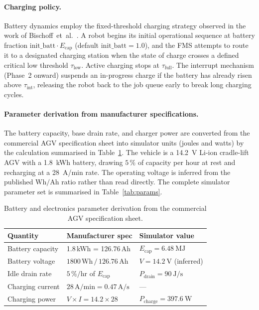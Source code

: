 \documentclass[conference]{IEEEtran}
\begin{document}
\paragraph{Charging policy.}
Battery dynamics employ the fixed-threshold charging strategy observed in the work of Bischoff~et~al.~\cite{bischoff2025}. A robot begins its initial operational sequence at battery fraction $\text{init\_batt} \cdot E_\text{cap}$ (default $\text{init\_batt} = 1.0$), and the FMS attempts to route it to a designated charging station when the state of charge crosses a defined critical low threshold $\tau_\text{low}$. Active charging stops at $\tau_\text{full}$. The interrupt mechanism (Phase~2 onward) suspends an in-progress charge if the battery has already risen above $\tau_\text{int}$, releasing the robot back to the job queue early to break long charging cycles.

\paragraph{Parameter derivation from manufacturer specifications.}
The battery capacity, base drain rate, and charger power are converted from the commercial AGV specification sheet into simulator units (joules and watts) by the calculation summarised in Table~\ref{tab:agv_spec}. The vehicle is a 14.2~V Li-ion cradle-lift AGV with a 1.8~kWh battery, drawing $5\,\%$ of capacity per hour at rest and recharging at a 28~A/min rate. The operating voltage is inferred from the published $\text{Wh}/\text{Ah}$ ratio rather than read directly. The complete simulator parameter set is summarised in Table~\ref{tab:params}.

\begin{table}[t]
  \centering
  \caption{Battery and electronics parameter derivation from the commercial AGV specification sheet.}
  \label{tab:agv_spec}
  \footnotesize
  \begin{tabular}{p{}p{}p{}}
    \toprule
    Quantity & Manufacturer spec & Simulator value \\
    \midrule
    Battery capacity      & 1.8\,kWh = 126.76\,Ah        & $E_\text{cap} = \SI{6.48}{\mega\joule}$ \\
    Battery voltage       & $1800\,\text{Wh}\,/\,126.76\,\text{Ah}$ & $V = \SI{14.2}{\volt}$ (inferred) \\
    Idle drain rate       & $5\,\%/\text{hr}$ of $E_\text{cap}$   & $P_\text{drain} = \SI{90}{\joule\per\second}$ \\
    Charging current      & $28\,\text{A}/\text{min} = 0.47\,\text{A}/\text{s}$ & --- \\
    Charging power        & $V \times I = 14.2 \times 28$ & $P_\text{charge} = \SI{397.6}{\watt}$ \\
    \bottomrule
  \end{tabular}
\end{table}
\end{document}
